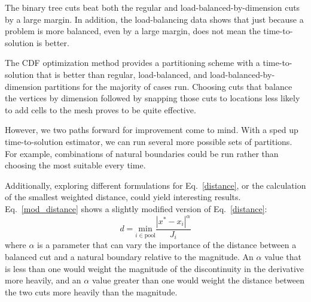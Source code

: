 The binary tree cuts beat both the regular and load-balanced-by-dimension cuts by a large margin. In addition, the load-balancing data shows that just because a problem is more balanced, even by a large margin, does not mean the time-to-solution is better.

The CDF optimization method provides a partitioning scheme with a time-to-solution that is better than regular, load-balanced, and load-balanced-by-dimension partitions for the majority of cases run.
Choosing cuts that balance the vertices by dimension followed by snapping those cuts to locations less likely to add cells to the mesh proves to be quite effective.

However, we two paths forward for improvement come to mind.
With a sped up time-to-solution estimator, we can run several more possible sets of partitions.
For example, combinations of natural boundaries could be run rather than choosing the most suitable every time.

Additionally, exploring different formulations for Eq.~\ref{distance}, or the calculation of the smallest weighted distance, could yield interesting results.
Eq.~\ref{mod_distance} shows a slightly modified version of Eq.~\ref{distance}:
\begin{equation}
d = \underset{i \in \text{pool}}{\text{min}} \frac{|x^{*} - x_i|^{\alpha}}{J_i}
\label{mod_distance}
\end{equation}
where $\alpha$ is a parameter that can vary the importance of the distance between a balanced cut and a natural boundary relative to the magnitude. An $\alpha$ value that is less than one would weight the magnitude of the discontinuity in the derivative more heavily, and an $\alpha$ value greater than one would weight the distance between the two cuts more heavily than the magnitude.
